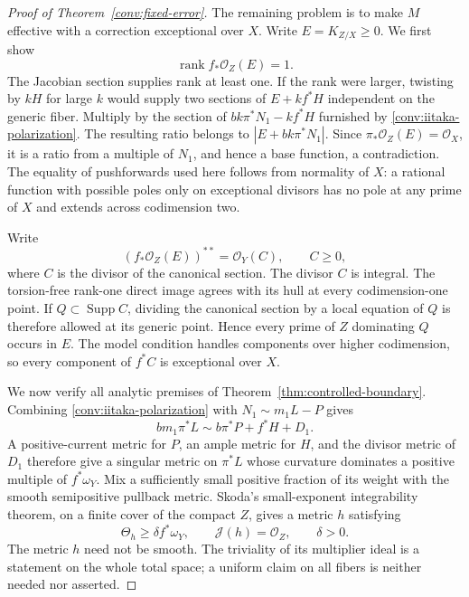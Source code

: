 \begin{proof}[Proof of Theorem~\ref{conv:fixed-error}]
The remaining problem is to make $M$ effective with a correction
exceptional over $X$.  Write $E=K_{Z/X}\ge0$.  We first show
\begin{equation}\label{conv:adjoint-rank}
 \operatorname{rank}f_*\mathcal O_Z(E)=1.
\end{equation}
The Jacobian section supplies rank at least one.  If the rank were
larger, twisting by $kH$ for large $k$ would supply two sections of
$E+kf^*H$ independent on the generic fiber.  Multiply by the section of
$bk\pi^*N_1-kf^*H$ furnished by
\eqref{conv:iitaka-polarization}.  The resulting ratio belongs to
$|E+bk\pi^*N_1|$.  Since
$\pi_*\mathcal O_Z(E)=\mathcal O_X$, it is a ratio from a multiple of
$N_1$, and hence a base function, a contradiction.  The equality of
pushforwards used here follows from normality of $X$: a rational
function with possible poles only on exceptional divisors has no pole
at any prime of $X$ and extends across codimension two.

Write
\[
 (f_*\mathcal O_Z(E))^{**}=\mathcal O_Y(C),\qquad C\ge0,
\]
where $C$ is the divisor of the canonical section.  The divisor $C$ is
integral.  The torsion-free rank-one direct image agrees with its hull
at every codimension-one point.  If $Q\subset\operatorname{Supp}C$,
dividing the canonical section by a local equation of $Q$ is therefore
allowed at its generic point.  Hence every prime of $Z$ dominating
$Q$ occurs in $E$.  The model condition handles components over higher
codimension, so every component of $f^*C$ is exceptional over $X$.

We now verify all analytic premises of
Theorem~\ref{thm:controlled-boundary}.  Combining
\eqref{conv:iitaka-polarization} with $N_1\sim m_1L-P$ gives
\[
 bm_1\pi^*L\sim b\pi^*P+f^*H+D_1.
\]
A positive-current metric for $P$, an ample metric for $H$, and the
divisor metric of $D_1$ therefore give a singular metric on $\pi^*L$
whose curvature dominates a positive multiple of $f^*\omega_Y$.
Mix a sufficiently small positive fraction of its weight with the
smooth semipositive pullback metric.  Skoda's small-exponent
integrability theorem, on a finite cover of the compact $Z$, gives a
metric $h$ satisfying
\begin{equation}\label{conv:strict-upstairs}
 \Theta_h\ge\delta f^*\omega_Y,
 \qquad \mathcal J(h)=\mathcal O_Z,
 \qquad \delta>0.
\end{equation}
The metric $h$ need not be smooth.  The triviality of its multiplier
ideal is a statement on the whole total space; a uniform claim on
all fibers is neither needed nor asserted.


\end{proof}
